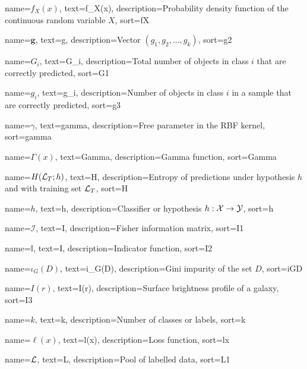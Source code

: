 %
{%
	name={$f_X(x)$},
	text={f_X(x)},
	description={Probability density function of the continuous random variable $X$},
	sort={fX}
}

%
{%
    name={$\bm{g}$},
    text={g},
    description={Vector $(g_1, g_2,...,g_k)$},
    sort={g2}
}

%
{%
    name={$G_i$},
    text={G_i},
    description={Total number of objects in class $i$ that are correctly predicted},
    sort={G1}
}

%
{%
    name={$g_i$},
    text={g_i},
    description={Number of objects in class $i$ in a sample that are correctly predicted},
    sort={g3}
}

%
{%
    name={$\gamma$},
    text={gamma},
    description={Free parameter in the RBF kernel},
    sort={gamma}
}

%
{%
    name={$\Gamma(x)$},
    text={Gamma},
    description={Gamma function},
    sort={Gamma}
}


%
{%
    name={$H(\mathcal{L}_T; h)$},
    text={H},
    description={Entropy of predictions under hypothesis $h$ and with training set $\mathcal{L}_T$},
    sort={H}
}

%
{%
    name={$h$},
    text={h},
    description={Classifier or hypothesis $h: \mathcal{X} \rightarrow \mathcal{Y}$},
    sort={h}
}

%
{%
    name={$\mathcal{I}$},
    text={I},
    description={Fisher information matrix},
    sort={I1}
}

%
{%
    name={$\mathbb{I}$},
    text={I},
    description={Indicator function},
    sort={I2}
}

%
{%
	name={$\iota_G(D)$},
	text={i_G(D)},
	description={Gini impurity of the set $D$},
	sort={iGD}
}

%
{%
	name={$I(r)$},
	text={I(r)},
	description={Surface brightness profile of a galaxy},
	sort={I3}
}

%
{%
	name={$k$},
	text={k},
	description={Number of classes or labels},
	sort={k}
}

%
{%
    name={$\ell(x)$},
    text={l(x)},
    description={Loss function},
    sort={lx}
}

%
{%
	name={$\mathcal{L}$},
	text={L},
	description={Pool of labelled data},
	sort={L1}
}


